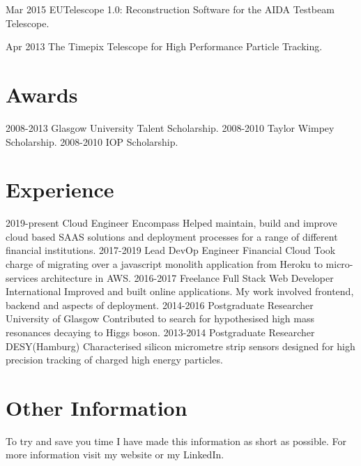 \documentclass[]{twentysecondcv}
\begin{document}
\begin{twentyshort}
  \twentyitemshort
    {Mar 2015}
    {EUTelescope 1.0: Reconstruction Software for the AIDA Testbeam Telescope.}
\end{twentyshort}

\begin{twentyshort}
  \twentyitemshort
    {Apr 2013}
    {The Timepix Telescope for High Performance Particle Tracking.}
\end{twentyshort}



\section*{Awards}

\begin{twentyshort}
  \twentyitemshort
    {2008-2013}
    {Glasgow University Talent Scholarship.}
  \twentyitemshort
    {2008-2010}
    {Taylor Wimpey Scholarship.}
  \twentyitemshort
    {2008-2010}
    {IOP Scholarship.}
\end{twentyshort}


\section*{Experience}

\begin{twenty}
  \twentyitem
  {2019-present}
  {Cloud Engineer}
  {Encompass}
  {Helped maintain, build and improve cloud based SAAS solutions and deployment processes for a range of different financial institutions.}
  \twentyitem
  {2017-2019}
  {Lead DevOp Engineer}
  {Financial Cloud}
  {Took charge of migrating over a javascript monolith application from Heroku to micro-services architecture in AWS.}
  \twentyitem
    {2016-2017}
    {Freelance Full Stack Web Developer}
    {International}
    {Improved and built online applications. My work involved frontend, backend and aspects of deployment.}
  \twentyitem
    {2014-2016}
    {Postgraduate Researcher}
    {University of Glasgow}
    {Contributed to search for hypothesised high mass resonances decaying to Higgs boson.}
\twentyitem
    {2013-2014}
    {Postgraduate Researcher}
		{DESY(Hamburg)}
    {Characterised silicon micrometre strip sensors designed for high precision tracking of charged high energy particles.}

\end{twenty}
\section*{Other Information}
\hspace*{5pt}
To try and save you time I have made this information as short as possible. For more information visit my website or my LinkedIn.
\hspace*{5pt}
\vspace*{2pt}

\end{document}
